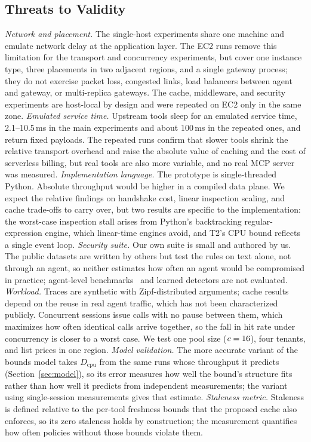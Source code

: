 \documentclass{ieeeaccess}
\newcommand{\ms}{\,ms\xspace}
\begin{document}
\subsection{Threats to Validity}
\emph{Network and placement.} The single-host experiments share one machine and emulate network delay at the application layer. The EC2 runs remove this limitation for the transport and concurrency experiments, but cover one instance type, three placements in two adjacent regions, and a single gateway process; they do not exercise packet loss, congested links, load balancers between agent and gateway, or multi-replica gateways. The cache, middleware, and security experiments are host-local by design and were repeated on EC2 only in the same zone.
\emph{Emulated service time.} Upstream tools sleep for an emulated service time, 2.1--10.5\ms in the main experiments and about 100\ms in the repeated ones, and return fixed payloads. The repeated runs confirm that slower tools shrink the relative transport overhead and raise the absolute value of caching and the cost of serverless billing, but real tools are also more variable, and no real MCP server was measured.
\emph{Implementation language.} The prototype is single-threaded Python. Absolute throughput would be higher in a compiled data plane. We expect the relative findings on handshake cost, linear inspection scaling, and cache trade-offs to carry over, but two results are specific to the implementation: the worst-case inspection stall arises from Python's backtracking regular-expression engine, which linear-time engines avoid, and T2's CPU bound reflects a single event loop.
\emph{Security suite.} Our own suite is small and authored by us. The public datasets are written by others but test the rules on text alone, not through an agent, so neither estimates how often an agent would be compromised in practice; agent-level benchmarks~\cite{debenedetti2024agentdojo,yang2025mcpsecbench} and learned detectors are not evaluated.
\emph{Workload.} Traces are synthetic with Zipf-distributed arguments; cache results depend on the reuse in real agent traffic, which has not been characterized publicly. Concurrent sessions issue calls with no pause between them, which maximizes how often identical calls arrive together, so the fall in hit rate under concurrency is closer to a worst case. We test one pool size ($c = 16$), four tenants, and list prices in one region.
\emph{Model validation.} The more accurate variant of the bounds model takes $D_{\mathrm{cpu}}$ from the same runs whose throughput it predicts (Section~\ref{sec:model}), so its error measures how well the bound's structure fits rather than how well it predicts from independent measurements; the variant using single-session measurements gives that estimate.
\emph{Staleness metric.} Staleness is defined relative to the per-tool freshness bounds that the proposed cache also enforces, so its zero staleness holds by construction; the measurement quantifies how often policies without those bounds violate them.
\end{document}
